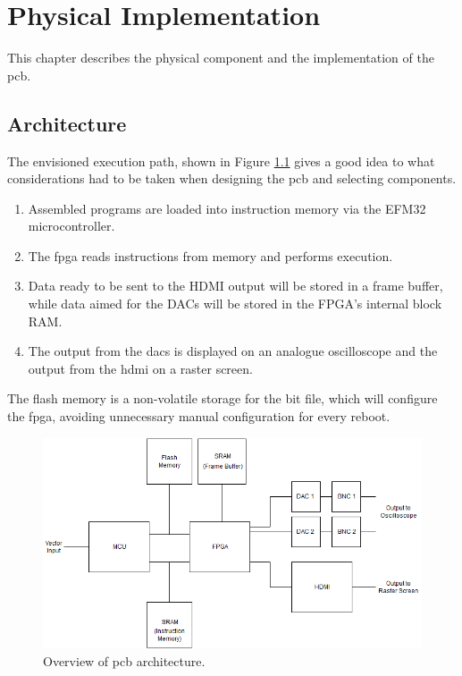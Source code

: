 \chapter{Physical Implementation}

This chapter describes the physical component and the implementation of the \gls{pcb}.

\section{Architecture}
The envisioned execution path, shown in Figure \ref{fig:PCB_Overview} gives a good idea to what considerations had to be taken when designing the \gls{pcb} and selecting components.

\begin{enumerate}
\item Assembled \vthreek programs are loaded into instruction memory via the EFM32 microcontroller.
\item The \gls{fpga} reads instructions from memory and performs execution.
\item Data ready to be sent to the HDMI output will be stored in a frame buffer, while data aimed for the DACs will be stored in the FPGA's internal block RAM.
\item The output from the \gls{dac}s is displayed on an analogue oscilloscope and the output from the \gls{hdmi} on a raster screen.
\end{enumerate}

The flash memory is a non-volatile storage for the bit file, which will configure the \gls{fpga}, avoiding unnecessary manual configuration for every reboot.

\begin{figure}[h!]
\centering
\includegraphics[scale = 0.56]{images/PCB_Overview.png}
\caption{Overview of \gls{pcb} architecture.}
\label{fig:PCB_Overview}
\end{figure}

